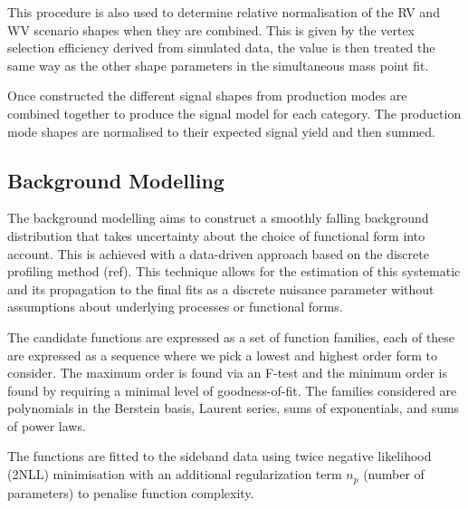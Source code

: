 This procedure is also used to determine relative normalisation of the RV and WV scenario shapes when they are combined. This is given by the vertex selection efficiency derived from simulated data, the value is then treated the same way as the other shape parameters in the simultaneous mass point fit. 

Once constructed the different signal shapes from production modes are combined together to produce the signal model for each category. The production mode shapes are normalised to their expected signal yield and then summed.



\subsection{Background Modelling}
The background modelling aims to construct a smoothly falling background distribution that takes uncertainty about the choice of functional form into account. This is achieved with a data-driven approach based on the discrete profiling method (ref). This technique allows for the estimation of this systematic and its propagation to the final fits as a discrete nuisance parameter without assumptions about underlying processes or functional forms. 

The candidate functions are expressed as a set of function families, each of these are expressed as a sequence where we pick a lowest and highest order form to consider. The maximum order is found via an F-test and the minimum order is found by requiring a minimal level of goodness-of-fit. 
The families considered are polynomials in the Berstein basis, Laurent series, sums of exponentials, and sums of power laws. 

The functions are fitted to the \mgg sideband data using twice negative likelihood (2NLL) minimisation with an additional regularization term $n_p$ (number of parameters) to penalise function complexity. 



